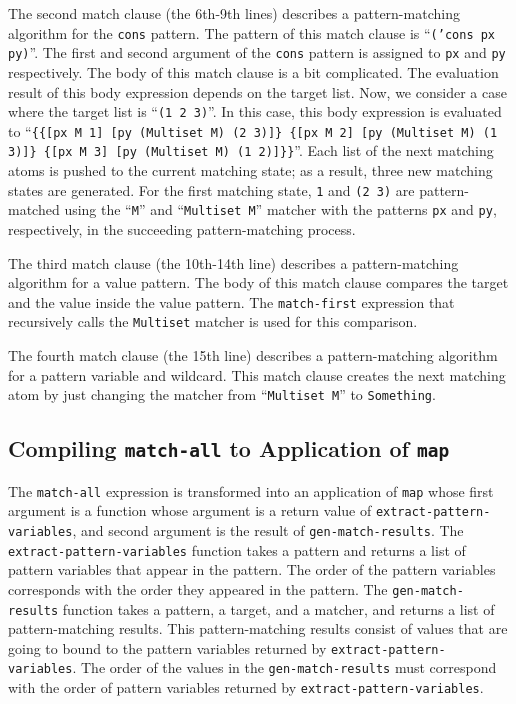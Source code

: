 \documentclass[acmlarge]{acmart}
\begin{document}
The second match clause (the 6th-9th lines) describes a pattern-matching algorithm for the \texttt{cons} pattern.
The pattern of this match clause is  ``\texttt{('cons px py)}''.
The first and second argument of the \texttt{cons} pattern is assigned to \texttt{px} and \texttt{py} respectively.
The body of this match clause is a bit complicated.
The evaluation result of this body expression depends on the target list.
Now, we consider a case where the target list is ``\texttt{(1 2 3)}''.
In this case, this body expression is evaluated to ``\texttt{\{\{[px M 1] [py (Multiset M) (2 3)]\} \{[px M 2] [py (Multiset M) (1 3)]\} \{[px M 3] [py (Multiset M) (1 2)]\}\}}''.
Each list of the next matching atoms is pushed to the current matching state; as a result, three new matching states are generated.
For the first matching state, \texttt{1} and \texttt{(2 3)} are pattern-matched using the ``\texttt{M}'' and ``\texttt{Multiset M}'' matcher with the patterns \texttt{px} and \texttt{py}, respectively, in the succeeding pattern-matching process.

The third match clause (the 10th-14th line) describes a pattern-matching algorithm for a value pattern.
The body of this match clause compares the target and the value inside the value pattern.
The \texttt{match-first} expression that recursively calls the \texttt{Multiset} matcher is used for this comparison.

The fourth match clause (the 15th line) describes a pattern-matching algorithm for a pattern variable and wildcard.
This match clause creates the next matching atom by just changing the matcher from ``\texttt{Multiset M}'' to \texttt{Something}.

\subsection{Compiling \texttt{match-all} to Application of \texttt{map}}\label{method-map}

The \texttt{match-all} expression is transformed into an application of \texttt{map} whose first argument is a function whose argument is a return value of \texttt{extract-pattern-variables}, and second argument is the result of \texttt{gen-match-results}.
The \texttt{extract-pattern-variables} function takes a pattern and returns a list of pattern variables that appear in the pattern.
The order of the pattern variables corresponds with the order they appeared in the pattern.
The \texttt{gen-match-results} function takes a pattern, a target, and a matcher, and returns a list of pattern-matching results.
This pattern-matching results consist of values that are going to bound to the pattern variables returned by \texttt{extract-pattern-variables}.
The order of the values in the \texttt{gen-match-results} must correspond with the order of pattern variables returned by \texttt{extract-pattern-variables}.
\end{document}
